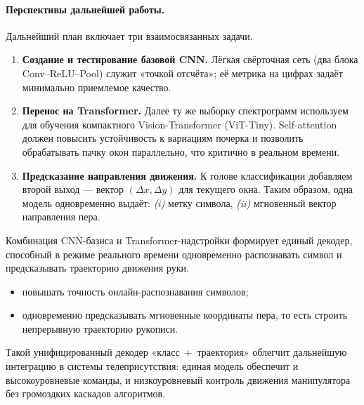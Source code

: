 \documentclass[12pt,a4paper]{article}
\begin{document}
\paragraph{Перспективы дальнейшей работы.}
Дальнейший план включает три взаимосвязанных задачи.


\begin{enumerate}
  \item \textbf{Создание и тестирование базовой CNN.}  
        Лёгкая свёрточная сеть (два блока Conv–ReLU–Pool) служит «точкой отсчёта»; её метрика на цифрах задаёт минимально приемлемое качество.


  \item \textbf{Перенос на Transformer.}  
        Далее ту же выборку спектрограмм используем для обучения компактного Vision-Transformer (ViT-Tiny). Self-attention должен повысить устойчивость к вариациям почерка и позволить обрабатывать пачку окон параллельно, что критично в реальном времени.


  \item \textbf{Предсказание направления движения.}  
        К голове классификации добавляем второй выход — вектор \((\Delta x, \Delta y)\) для текущего окна. Таким образом, одна модель одновременно выдаёт:  
        \emph{(i)} метку символа, \emph{(ii)} мгновенный вектор направления пера.
\end{enumerate}


Комбинация CNN-базиса и Transformer-надстройки формирует единый декодер, способный в режиме реального времени одновременно распознавать символ и предсказывать траекторию движения руки.




\begin{itemize}
  \item повышать точность онлайн-распознавания символов;
  \item одновременно предсказывать мгновенные координаты пера, то есть строить непрерывную траекторию рукописи.
\end{itemize}


Такой унифицированный декодер «класс~+~траектория» облегчит дальнейшую интеграцию в системы телеприсутствия: единая модель обеспечит и высокоуровневые команды, и низкоуровневый контроль движения манипулятора без громоздких каскадов алгоритмов.
\end{document}
